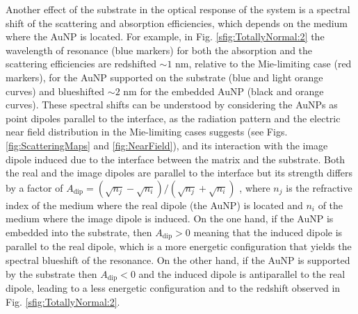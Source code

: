 Another effect of the substrate in the optical response of the system is a spectral shift of the scattering and absorption efficiencies, which depends on the medium where the AuNP is located. For example, in Fig. \ref{sfig:TotallyNormal:2} the wavelength of resonance (blue markers) for both the absorption and the scattering efficiencies are redshifted $\sim 1$ nm, relative to the Mie-limiting case (red markers), for the AuNP supported on the substrate (blue and light orange curves) and blueshifted $\sim 2$ nm for the embedded AuNP (black and orange curves). These spectral shifts can be understood by considering the AuNPs as point dipoles parallel to the interface, as the radiation pattern and the electric near field distribution in the Mie-limiting cases suggests (see Figs. \ref{fig:ScatteringMaps} and  \ref{fig:NearField}), and its interaction with the image dipole induced due to the interface between the matrix and the substrate. Both the real and the image dipoles are parallel to the interface but its strength differs by  a factor of $A_\text{dip} = (\sqrt{n_j}-\sqrt{n_i}) / (\sqrt{n_j}+\sqrt{n_i})$ \cite{barrera1991optical}, where $n_{j}$ is the refractive index of the medium where the real dipole (the AuNP) is located and $n_i$ of the medium where the image dipole is induced. On the one hand, if the AuNP is embedded into the substrate, then $A_\text{dip}>0$ meaning that the induced dipole is parallel to the real dipole, which is a more energetic configuration that yields the spectral blueshift of the resonance. On the other hand, if the AuNP is supported by the substrate then $A_\text{dip}<0$ and the induced dipole is antiparallel to the real dipole, leading to a less energetic configuration and to the redshift observed in Fig. \ref{sfig:TotallyNormal:2}.%


